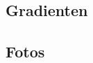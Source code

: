 \documentclass[a4paper, 10pt, twoside, onecolumn, parskip]{scrartcl}
\begin{document}
    \subsection{Gradienten} \label{subsec:gradienten}


    \subsection{Fotos} \label{subsec:fotos}
\end{document}
